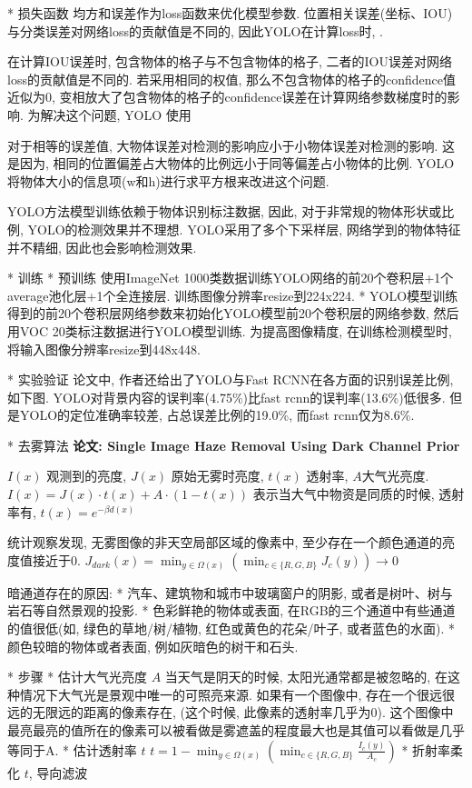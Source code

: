 {				* 损失函数
					均方和误差作为loss函数来优化模型参数. 位置相关误差(坐标、IOU)与分类误差对网络loss的贡献值是不同的, 因此YOLO在计算loss时, .

					在计算IOU误差时, 包含物体的格子与不包含物体的格子, 二者的IOU误差对网络loss的贡献值是不同的. 若采用相同的权值, 那么不包含物体的格子的confidence值近似为0, 变相放大了包含物体的格子的confidence误差在计算网络参数梯度时的影响. 为解决这个问题, YOLO 使用

					对于相等的误差值, 大物体误差对检测的影响应小于小物体误差对检测的影响. 这是因为, 相同的位置偏差占大物体的比例远小于同等偏差占小物体的比例. YOLO将物体大小的信息项(w和h)进行求平方根来改进这个问题. 

					YOLO方法模型训练依赖于物体识别标注数据, 因此, 对于非常规的物体形状或比例, YOLO的检测效果并不理想. YOLO采用了多个下采样层, 网络学到的物体特征并不精细, 因此也会影响检测效果. 

			* 训练
				* 预训练
					使用ImageNet 1000类数据训练YOLO网络的前20个卷积层+1个average池化层+1个全连接层. 训练图像分辨率resize到224x224. 
				* YOLO模型训练
					得到的前20个卷积层网络参数来初始化YOLO模型前20个卷积层的网络参数, 然后用VOC 20类标注数据进行YOLO模型训练. 为提高图像精度, 在训练检测模型时, 将输入图像分辨率resize到448x448. 

			* 实验验证
				论文中, 作者还给出了YOLO与Fast RCNN在各方面的识别误差比例, 如下图. YOLO对背景内容的误判率(4.75\%)比fast rcnn的误判率(13.6\%)低很多. 但是YOLO的定位准确率较差, 占总误差比例的19.0\%, 而fast rcnn仅为8.6\%. 

	* 去雾算法
		\bf{论文}: Single Image Haze Removal Using Dark Channel Prior

			$I(x)$ 观测到的亮度, $J(x)$ 原始无雾时亮度, $t(x)$ 透射率, $A$大气光亮度.
			$I(x) = J(x) · t(x) + A · (1 - t(x))$
			表示当大气中物资是同质的时候, 透射率有,
			$t(x) = e^{-\beta d(x)}$

			统计观察发现, 无雾图像的非天空局部区域的像素中, 至少存在一个颜色通道的亮度值接近于0.
			$J_{dark}(x) = \min_{y\in \Omega(x)} (\min_{c\in \{R,G,B\}} J_c(y)) \to 0$

			暗通道存在的原因:
				* 汽车、建筑物和城市中玻璃窗户的阴影, 或者是树叶、树与岩石等自然景观的投影.
				* 色彩鲜艳的物体或表面, 在RGB的三个通道中有些通道的值很低(如, 绿色的草地/树/植物, 红色或黄色的花朵/叶子, 或者蓝色的水面).
				* 颜色较暗的物体或者表面, 例如灰暗色的树干和石头. 

		* 步骤
			* 估计大气光亮度 $A$
				当天气是阴天的时候, 太阳光通常都是被忽略的, 在这种情况下大气光是景观中唯一的可照亮来源. 如果有一个图像中, 存在一个很远很远的无限远的距离的像素存在, (这个时候, 此像素的透射率几乎为0). 这个图像中最亮最亮的值所在的像素可以被看做是雾遮盖的程度最大也是其值可以看做是几乎等同于A.
			* 估计透射率 $t$
				$t = 1 - \min_{y\in \Omega(x)} ( \min_{c\in \{R,G,B\}} \frac{I_c(y)}{A_c} )$
			* 折射率柔化 $t$, 导向滤波
			
}
